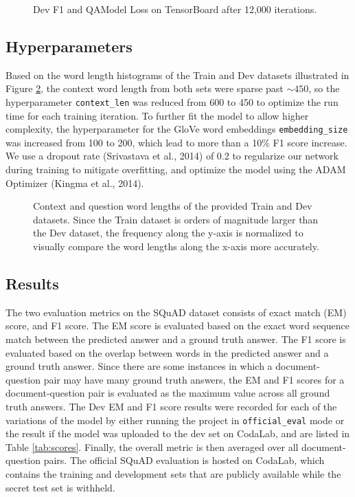 \documentclass{article} %
\begin{document}
\begin{figure}[hp!]%
\centering
{}%
\qquad
{}%
\caption{
Dev F1 and QAModel Loss on TensorBoard after 12,000 iterations.
}%
\label{fig:f1_loss}%
\end{figure}

\subsection{Hyperparameters}
Based on the word length histograms of the Train and Dev datasets illustrated in Figure \ref{fig:wordlen},
the context word length from both sets were sparse past ${\sim}450$, so the hyperparameter
\texttt{context\_len} was reduced from 600 to 450 to optimize the run time for each training iteration.
To further fit the model to allow higher complexity, the hyperparameter for the GloVe word embeddings
\texttt{embedding\_size} was increased from 100 to 200, which lead to more than a 10\% F1 score increase.
We use a dropout rate (Srivastava et al., 2014) of 0.2 to regularize our network during
training to mitigate overfitting,
and optimize the model using the ADAM Optimizer (Kingma et al., 2014).

\begin{figure}[hp!]%
\centering
{}%
\qquad
{}%
\caption{Context and question word lengths of the provided Train and Dev datasets.
Since the Train dataset is orders of magnitude larger than the Dev dataset,
the frequency along the y-axis is normalized to visually compare the word lengths
along the x-axis more accurately.
}%
\label{fig:wordlen}%
\end{figure}

\subsection{Results}
The two evaluation metrics on the SQuAD dataset consists of exact match (EM) score, and F1 score.
The EM score is evaluated based on the exact word sequence match between the predicted answer
and a ground truth answer.
The F1 score is evaluated based on the overlap between words in the predicted answer and a ground truth answer.
Since there are some instances in which a document-question pair may have many ground truth answers,
the EM and F1 scores for a document-question pair is evaluated as the maximum value across all ground truth answers.
The Dev EM and F1 score results were recorded for each of the variations of the model
by either running the project in \texttt{official\_eval} mode
or the result if the model was uploaded to the dev set on CodaLab,
and are listed in Table \ref{tab:scores}.
Finally, the overall metric is then averaged over all document-question pairs.
The official SQuAD evaluation is hosted on CodaLab, which contains the training and development sets
that are publicly available while the secret test set is withheld.
\end{document}
